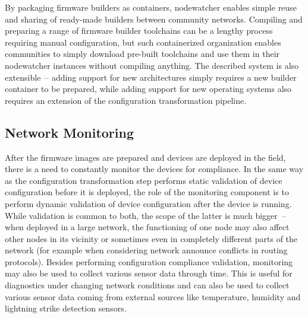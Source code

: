 \documentclass[5p,sort&compress]{elsarticle}
\begin{document}
By packaging firmware builders as containers, nodewatcher enables simple reuse and sharing of ready-made builders between community networks.
Compiling and preparing a range of firmware builder toolchains can be a lengthy process requiring manual configuration, but such containerized organization enables communities to simply download pre-built toolchains and use them in their nodewatcher instances without compiling anything. The described system is also extensible~-- adding support for new architectures simply requires a new builder container to be prepared, while adding support for new operating systems also requires an extension of the configuration transformation pipeline.

\subsection{Network Monitoring}
\label{sec:network-monitoring}

After the firmware images are prepared and devices are deployed in the field, there is a need to constantly monitor the devices for compliance.
In the same way as the configuration transformation step performs static validation of device configuration before it is deployed, the role of the monitoring component is to perform dynamic validation of device configuration after the device is running.
While validation is common to both, the scope of the latter is much bigger~-- when deployed in a large network, the functioning of one node may also affect other nodes in its vicinity or sometimes even in completely different parts of the network (for example when considering network announce conflicts in routing protocols).
Besides performing configuration compliance validation, monitoring may also be used to collect various sensor data through time.
This is useful for diagnostics under changing network conditions and can also be used to collect various sensor data coming from external sources like temperature, humidity and lightning strike detection sensors.
\end{document}
